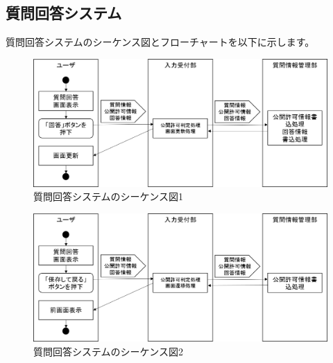 \newpage
\subsection{質問回答システム}
質問回答システムのシーケンス図とフローチャートを以下に示します。

\begin{figure}[htbp]
  \begin{center}
    \includegraphics[width=1\linewidth,clip]{./img/q_reply/main1.png}
    \caption{質問回答システムのシーケンス図1}\label{fig:qreplyseaquence1}
  \end{center}
\end{figure}

\begin{figure}[htbp]
  \begin{center}
    \includegraphics[width=1\linewidth,clip]{./img/q_reply/main2.png}
    \caption{質問回答システムのシーケンス図2}\label{fig:qreplyseaquence}
  \end{center}
\end{figure}

